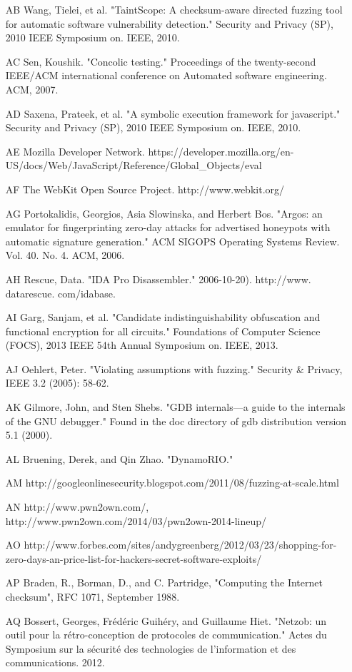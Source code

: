 \documentclass[11pt,expanded,copyright]{fsuthesis}
\begin{document}
\begin{itemize}
	\item [AB] Wang, Tielei, et al. "TaintScope: A checksum-aware directed fuzzing tool for automatic software vulnerability detection." Security and Privacy (SP), 2010 IEEE Symposium on. IEEE, 2010.
	\item [AC] Sen, Koushik. "Concolic testing." Proceedings of the twenty-second IEEE/ACM international conference on Automated software engineering. ACM, 2007.
	\item [AD] Saxena, Prateek, et al. "A symbolic execution framework for javascript." Security and Privacy (SP), 2010 IEEE Symposium on. IEEE, 2010.
	\item [AE] Mozilla Developer Network. https://developer.mozilla.org/en-US/docs/Web/JavaScript/Reference/Global\_Objects/eval
	\item [AF] The WebKit Open Source Project. http://www.webkit.org/
	\item [AG] Portokalidis, Georgios, Asia Slowinska, and Herbert Bos. "Argos: an emulator for fingerprinting zero-day attacks for advertised honeypots with automatic signature generation." ACM SIGOPS Operating Systems Review. Vol. 40. No. 4. ACM, 2006.
	\item [AH] Rescue, Data. "IDA Pro Disassembler." 2006-10-20). http://www. datarescue. com/idabase.
	\item [AI] Garg, Sanjam, et al. "Candidate indistinguishability obfuscation and functional encryption for all circuits." Foundations of Computer Science (FOCS), 2013 IEEE 54th Annual Symposium on. IEEE, 2013.
	\item [AJ] Oehlert, Peter. "Violating assumptions with fuzzing." Security \& Privacy, IEEE 3.2 (2005): 58-62.
	\item [AK] Gilmore, John, and Sten Shebs. "GDB internals—a guide to the internals of the GNU debugger." Found in the doc directory of gdb distribution version 5.1 (2000).
	\item [AL] Bruening, Derek, and Qin Zhao. "DynamoRIO."	
	\item [AM] http://googleonlinesecurity.blogspot.com/2011/08/fuzzing-at-scale.html
	\item [AN] http://www.pwn2own.com/, http://www.pwn2own.com/2014/03/pwn2own-2014-lineup/
	\item [AO] http://www.forbes.com/sites/andygreenberg/2012/03/23/shopping-for-zero-days-an-price-list-for-hackers-secret-software-exploits/
	\item [AP] Braden, R., Borman, D., and C. Partridge, "Computing the Internet checksum", RFC 1071, September 1988.
	\item [AQ] Bossert, Georges, Frédéric Guihéry, and Guillaume Hiet. "Netzob: un outil pour la rétro-conception de protocoles de communication." Actes du Symposium sur la sécurité des technologies de l'information et des communications. 2012.

\end{itemize}
\end{document}
